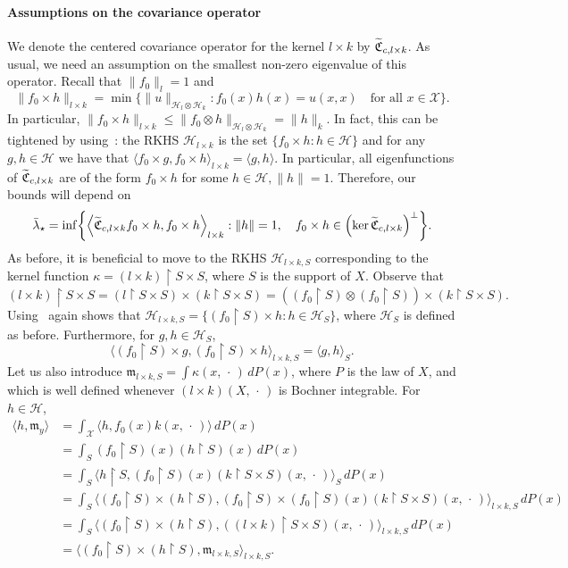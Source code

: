 \documentclass[10pt]{amsart}
\theoremstyle{definition}\newtheorem{defi}[theo]{Definition}\newtheorem{rema}[theo]{Remark}\newtheorem{exam}[theo]{Example}\newtheorem{exem}[theo]{Example}\newtheorem{nota}[theo]{Notation}
\theoremstyle{remark}
\newcommand{\restr}
{\!\!\upharpoonright\!}
\newcommand{\restrr}
{\!\!\upharpoonright\!\!}
\newcommand{\X}{\mathcal{X}}
\newcommand{\cH}{\mathcal{H}}
\newcommand{\fkC}{\mathfrak{C}}
\newcommand{\mean}{\mathfrak{m}}
\let\oldtilde\tilde
\renewcommand*{\tilde}[1]{\mathchoice{\widetilde{#1}}{\widetilde{#1}}{\oldtilde{#1}}{\oldtilde{#1}}}
\let\originalleft\left
\let\originalright\right
\renewcommand{\left}{\mathopen{}\mathclose\bgroup\originalleft}
\renewcommand{\right}{\aftergroup\egroup\originalright}
\begin{document}
\paragraph{Assumptions on the covariance operator}
We denote the centered covariance operator for the kernel $l \times k$ by $\tilde{\fkC}_{c,l\times k}$. As usual, we need an assumption on the smallest non-zero eigenvalue of this operator. Recall that $\|f_0\|_{l} = 1$ and
\[
\|f_0 \times h\|_{l \times k} = \min \bigl\{ \|u\|_{\cH_l \otimes \cH_k} : f_0(x) h(x) = u(x,x) \quad\text{for all } x\in \X\bigr\}.
\]
In particular, $\|f_0 \times h\|_{l \times k} \leq \|f_0 \otimes h \|_{\cH_l \otimes \cH_k} = \|h\|_k$. In fact, this can be tightened by using~\cite[Proposition~5.20]{PAUL16}: the RKHS $\cH_{l \times k}$ is the set $\{ f_0 \times h: h \in \cH\}$ and for any $g,h \in \cH$ we have that $\langle f_0 \times g, f_0 \times h \rangle_{l \times k} = \langle g, h \rangle$. In particular, all eigenfunctions\pagebreak{} of $\tilde{\fkC}_{c,l\times k}$ are of the form $f_0 \times h$ for some $h\in \cH, \|h\|=1$. Therefore, our bounds will depend on
\begin{equation}
\bar \lambda_\star = \inf \left\{ \left\langle \tilde{\fkC}_{c,l\times k} f_0 \times h, f_0 \times h \right\rangle_{l \times k} : \|h \|= 1,\quad f_0 \times h \in \left(\ker \tilde{\fkC}_{c,l\times k}\right)^\perp \right\}.
\end{equation}
As before, it is beneficial to move to the RKHS $\cH_{l\times k,S}$ corresponding to the kernel function $\kappa = (l \times k)\restrr S \times S$, where $S$ is the support of $X$. Observe that
\[
(l \times k) \restr S \times S = (l \restr S \times S) \times (k \restr S \times S) = ((f_0 \restr S) \otimes (f_0 \restr S)) \times(k \restr S \times S).
\]
Using~\cite[Proposition~5.20]{PAUL16} again shows that $\cH_{l\times k,S} = \{ (f_0 \restr S) \times h : h \in \cH_S \}$, where $\cH_S$ is defined as before. Furthermore, for $g,h \in \cH_S$,
\[
\langle (f_0 \restr S) \times g, (f_0 \restr S) \times h \rangle_{l\times k, S} =
\langle g, h \rangle_S.
\]
Let us also introduce $\mean_{l\times k, S} = \int \kappa(x, \,\cdot\,) \,dP(x)$, where $P$ is the law of $X$, and which is well defined whenever $(l \times k)(X,\,\cdot\,)$ is Bochner integrable. For $h\in \cH$,
\begin{align*}
\langle h, \mean_y \rangle &= \int_\X \langle h, f_0(x) k(x,\,\cdot\,) \rangle \,dP(x) \\
&= \int_S (f_0 \restr S)(x) (h\restr S) (x) \, dP(x) \\
&= \int_S \bigl\langle h\restr S, (f_0\restr S)(x) (k\restr S\times S)(x,\,\cdot\,) \bigr\rangle_S \,dP(x) \\
&=\int_S \bigl\langle (f_0 \restr S)\times (h\restr S), (f_0\restr S) \times (f_0\restr S)(x) (k\restr S\times S)(x,\,\cdot\,) \bigr\rangle_{l\times k,S} \,dP(x) \\
&=\int_S \bigl\langle (f_0 \restr S)\times (h\restr S), ((l \times k)\restr S \times S)(x,\,\cdot\,) \bigr\rangle_{l\times k,S} \,dP(x) \\
&= \bigl\langle (f_0 \restr S)\times (h\restr S), \mean_{l\times k,S} \bigr\rangle_{l\times k, S}.
\end{align*}
\end{document}
